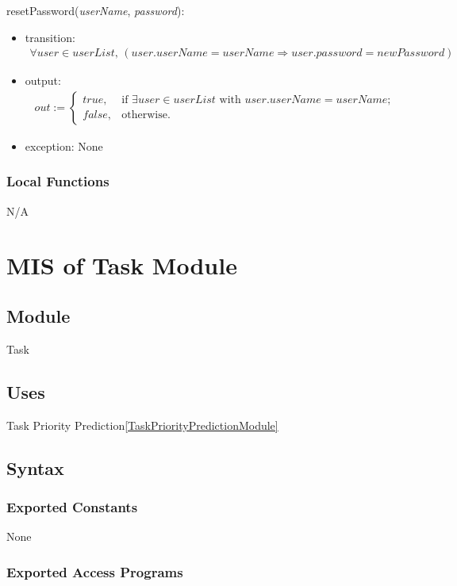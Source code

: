 \documentclass[12pt, titlepage]{article}
\begin{document}
\noindent resetPassword(\textit{userName}, \textit{password}):
\begin{itemize}
\item transition: 
\begin{align*}
\forall user \in userList, \, (user.userName = userName \Rightarrow user.password = newPassword)
\end{align*}

\item output: 
\begin{align*}
out := \begin{cases}
true, & \text{if } \exists user \in userList \text{ with } user.userName = userName; \\
false, & \text{otherwise.}
\end{cases}
\end{align*}

\item exception: None
\end{itemize}

\subsubsection{Local Functions}
N/A

\newpage
\section{MIS of Task Module} \label{TaskModule}

\subsection{Module}
Task

\subsection{Uses}
Task Priority Prediction\ref{TaskPriorityPredictionModule}
\
\subsection{Syntax}

\subsubsection{Exported Constants}
None

\subsubsection{Exported Access Programs}
\end{document}
